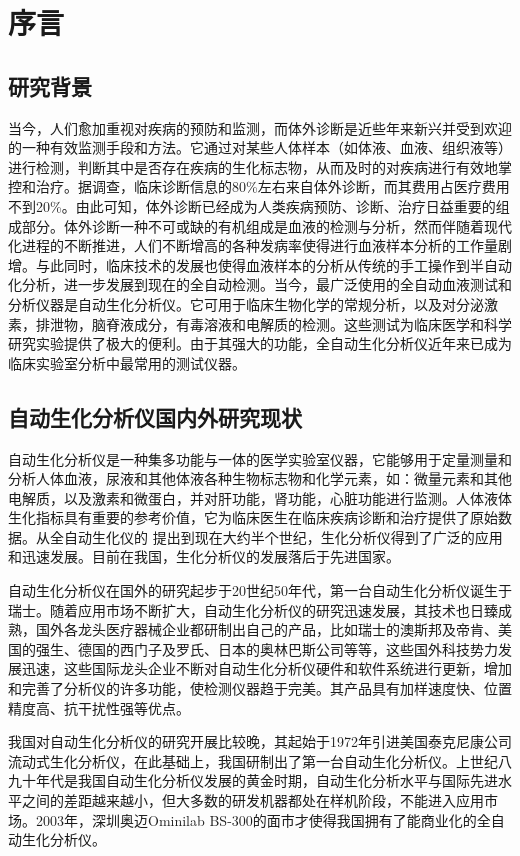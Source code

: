 
\chapter{序言}
\section{研究背景}
当今，人们愈加重视对疾病的预防和监测，而体外诊断是近些年来新兴并受到欢迎的一种有效监测手段和方法。它通过对某些人体样本（如体液、血液、组织液等）进行检测，判断其中是否存在疾病的生化标志物，从而及时的对疾病进行有效地掌控和治疗。据调查，临床诊断信息的80\%左右来自体外诊断，而其费用占医疗费用不到20\%。由此可知，体外诊断已经成为人类疾病预防、诊断、治疗日益重要的组成部分。体外诊断一种不可或缺的有机组成是血液的检测与分析，然而伴随着现代化进程的不断推进，人们不断增高的各种发病率使得进行血液样本分析的工作量剧增。与此同时，临床技术的发展也使得血液样本的分析从传统的手工操作到半自动化分析，进一步发展到现在的全自动检测。当今，最广泛使用的全自动血液测试和分析仪器是自动生化分析仪。它可用于临床生物化学的常规分析，以及对分泌激素，排泄物，脑脊液成分，有毒溶液和电解质的检测。这些测试为临床医学和科学研究实验提供了极大的便利。由于其强大的功能，全自动生化分析仪近年来已成为临床实验室分析中最常用的测试仪器。
\section{自动生化分析仪国内外研究现状}
自动生化分析仪是一种集多功能与一体的医学实验室仪器，它能够用于定量测量和分析人体血液，尿液和其他体液各种生物标志物和化学元素，如：微量元素和其他电解质，以及激素和微蛋白，并对肝功能，肾功能，心脏功能进行监测。人体液体生化指标具有重要的参考价值，它为临床医生在临床疾病诊断和治疗提供了原始数据。从全自动生化仪的 提出到现在大约半个世纪，生化分析仪得到了广泛的应用和迅速发展。目前在我国，生化分析仪的发展落后于先进国家。

自动生化分析仪在国外的研究起步于20世纪50年代，第一台自动生化分析仪诞生于瑞士。随着应用市场不断扩大，自动生化分析仪的研究迅速发展，其技术也日臻成熟，国外各龙头医疗器械企业都研制出自己的产品，比如瑞士的澳斯邦及帝肯、美国的强生、德国的西门子及罗氏、日本的奥林巴斯公司等等\supercite{bib2}，这些国外科技势力发展迅速，这些国际龙头企业不断对自动生化分析仪硬件和软件系统进行更新，增加和完善了分析仪的许多功能，使检测仪器趋于完美。其产品具有加样速度快、位置精度高、抗干扰性强等优点。

我国对自动生化分析仪的研究开展比较晚，其起始于1972年引进美国泰克尼康公司流动式生化分析仪，在此基础上，我国研制出了第一台自动生化分析仪。上世纪八九十年代是我国自动生化分析仪发展的黄金时期，自动生化分析水平与国际先进水平之间的差距越来越小，但大多数的研发机器都处在样机阶段，不能进入应用市场。2003年，深圳奥迈Ominilab BS-300的面市才使得我国拥有了能商业化的全自动生化分析仪\supercite{bib1}。

